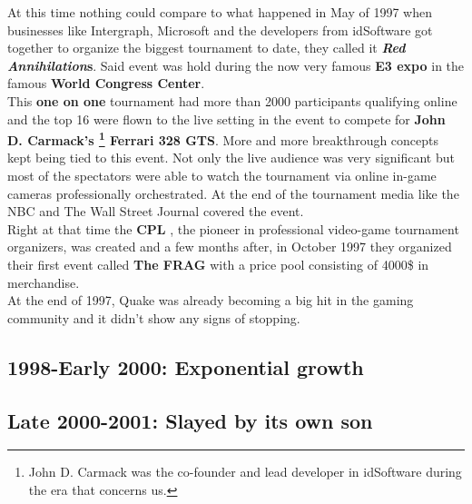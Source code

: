 At this time nothing could compare to what happened in May of 1997 when businesses like Intergraph, Microsoft and the developers from idSoftware got together to organize the biggest tournament to date, they called it \textbf{\textit{Red Annihilation}s}. Said event was hold during the now very famous \textbf{E3 expo} \cite{e3} in the famous \textbf{World Congress Center}.\\

This \textbf{one on one} tournament had more than 2000 participants qualifying online and the top 16 were flown to the live setting in the event to compete for \textbf{John D. Carmack's \footnote{John D. Carmack was the co-founder and lead developer in idSoftware during the era that concerns us.} Ferrari 328 GTS}. More and more breakthrough concepts kept being tied to this event. Not only the live audience was very significant but most of the spectators were able to watch the tournament via online in-game cameras professionally orchestrated. At the end of the tournament media like the NBC and The Wall Street Journal covered the event.\\

Right at that time the \textbf{CPL} \citep{web:cpl}, the pioneer in professional video-game tournament organizers, was created and a few months after, in October 1997 they organized their first event called \textbf{The FRAG} with a price pool consisting of 4000\$ in merchandise.\\

At the end of 1997, Quake was already becoming a big hit in the gaming community and it didn't show any signs of stopping.\\

\subsection{1998-Early 2000: Exponential growth}




\subsection{Late 2000-2001: Slayed by its own son}

